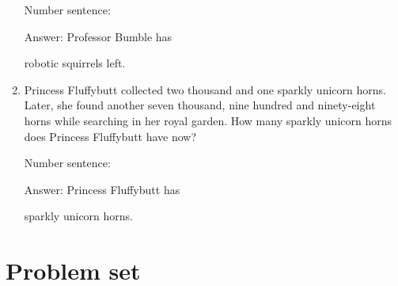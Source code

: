 \documentclass{tufte-book}
\begin{document}
\begin{enumerate}
\medskip Number sentence: \dotfill\medskip

Answer: Professor Bumble has \dotfill\medskip\par\mbox{}\dotfill\medskip\par\mbox{}\dotfill\bigskip
robotic squirrels left.

\item Princess Fluffybutt collected two thousand and one sparkly unicorn horns. Later, she found another seven thousand, nine hundred and ninety-eight horns while searching in her royal garden. How many sparkly unicorn horns does Princess Fluffybutt have now?

\medskip Number sentence: \dotfill\medskip

Answer: Princess Fluffybutt has 
\dotfill\medskip\par\mbox{}\dotfill\medskip\par\mbox{}\dotfill\bigskip
sparkly unicorn horns.

\end{enumerate}

\clearpage\section{Problem set }
\end{document}
